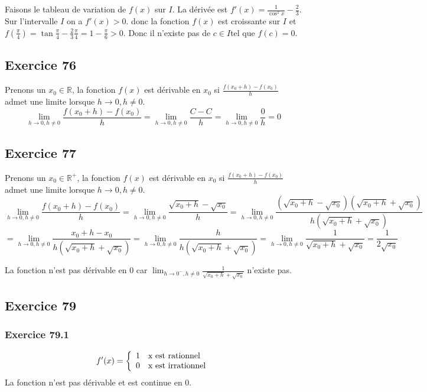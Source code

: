 \documentclass[]{book}
\theoremstyle{definition}
\newcommand{\bb}[1]{\mathbb{#1}}
\newcommand{\R}{\bb{R}}
\begin{document}
Faisons le tableau de variation de $f(x)$ sur $I$. La d\'eriv\'ee est $f'(x) = \frac{1}{\cos^2 x} - \frac{2}{3}$. Sur l'intervalle $I$ on a $f'(x) > 0$. donc la fonction $f(x)$ est croissante sur $I$ et $f(\frac{\pi}{4}) = \tan \frac{\pi}{4} - \frac{2}{3}\frac{\pi}{4} = 1 - \frac{\pi}{6} > 0$. Donc il n'existe pas de $c \in I$tel que $f(c) = 0$.  


\subsection*{Exercice 76}
Prenons un $x_0 \in \R$, la fonction $f(x)$ est d\'erivable en $x_0$ si $\frac{f(x_0+h)-f(x_0)}{h}$ admet une limite lorsque $h \to 0, h \neq 0$.
$$\lim_{h \to 0, h \neq 0} \frac{f(x_0+h)-f(x_0)}{h} = \lim_{h \to 0, h \neq 0} \frac{C-C}{h} = \lim_{h \to 0, h \neq 0} \frac{0}{h} = 0$$


\subsection*{Exercice 77}
Prenons un $x_0 \in \R^{+}$, la fonction $f(x)$ est d\'erivable en $x_0$ si $\frac{f(x_0+h)-f(x_0)}{h}$ admet une limite lorsque $h \to 0, h \neq 0$.
$$\lim_{h \to 0, h \neq 0} \frac{f(x_0+h)-f(x_0)}{h} = \lim_{h \to 0, h \neq 0} \frac{\sqrt{x_0+h}-\sqrt{x_0}}{h} = \lim_{h \to 0, h \neq 0} \frac{(\sqrt{x_0+h}-\sqrt{x_0})(\sqrt{x_0+h}+\sqrt{x_0})}{h(\sqrt{x_0+h}+\sqrt{x_0})}$$
$$= \lim_{h \to 0, h \neq 0} \frac{x_0+h-x_0}{h(\sqrt{x_0+h}+\sqrt{x_0})} = \lim_{h \to 0, h \neq 0} \frac{h}{h(\sqrt{x_0+h}+\sqrt{x_0})} = \lim_{h \to 0, h \neq 0} \frac{1}{\sqrt{x_0+h}+\sqrt{x_0}} = \frac{1}{2\sqrt{x_0}}$$

La fonction n'est pas d\'erivable en 0 car $\lim_{h \to 0^{-}, h \neq 0} \frac{1}{\sqrt{x_0+h}+\sqrt{x_0}}$ n'existe pas.\\


\subsection*{Exercice 79}
\subsubsection*{Exercice 79.1}
$$f'(x) = 
\left\{ 
\begin{array}{l l}
1 & \textrm{x est rationnel}\\
0 & \textrm{x est irrationnel}\\
\end{array}
\right. 
$$
La fonction n'est pas d\'erivable et est continue en 0.
\end{document}
